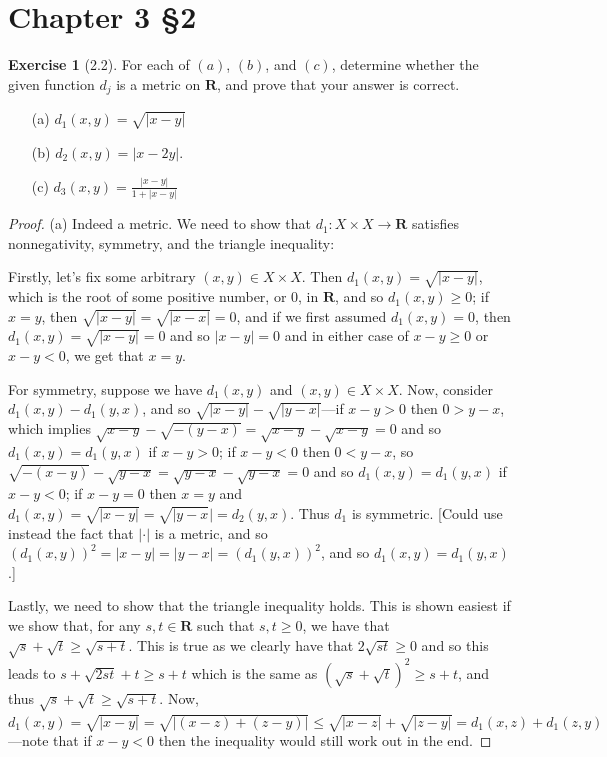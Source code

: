 \documentclass[9pt,reqno]{amsart}
\theoremstyle{definition}
\newtheorem{exercise}{Exercise}[section]
\newcommand{\rr}{\mathbf R}
\begin{document}
\section{Chapter 3 \S 2}
\begin{exercise}[2.2]
	 For each of $(a)$, $(b)$, and $(c)$, determine whether the given function $d_j$ is a metric on $\rr$, and prove that your answer is correct.
	 \begin{itemize}
	 	\item [(a)] $d_1 (x, y) = \sqrt{ |x-y|}$
	 	\item [(b)] $d_2 (x, y) = |x-2y|$.
	 	\item [(c)] $d_3 (x, y) = \frac{|x-y|}{1+|x-y|}$
	 \end{itemize}
\end{exercise}
\begin{proof}
	(a) Indeed a metric. We need to show that $d_1 \colon X \times X \to \rr$  satisfies nonnegativity, symmetry, and the triangle inequality:
	
	 Firstly, let's fix some arbitrary $(x,y) \in X \times X$. Then $d_1(x,y) = \sqrt{|x-y|}$, which is the root of some positive number, or $0$, in $\rr$, and so $d_1(x,y) \geq 0$; if $x =y$, then $\sqrt{|x-y|} = \sqrt{|x-x|} = 0$, and if we first assumed $d_1(x,y)= 0$, then $d_1(x,y) = \sqrt{|x-y|} = 0$ and so $|x-y| = 0$ and in either case of $x-y\geq 0$ or $x-y < 0$, we get that $x=y$. 
	 
	 For symmetry, suppose we have $d_1(x,y)$ and $(x,y) \in X \times X$. Now, consider $d_1(x,y) - d_1(y,x)$, and so $\sqrt{|x-y|} - \sqrt{|y-x|}$---if $x-y>0$ then $0 >y-x$, which implies $\sqrt{x-y} - \sqrt{-(y-x)}  = \sqrt{x-y} - \sqrt{x-y} = 0$ and so $d_1(x,y) = d_1(y,x)$ if $x-y>0$; if $x-y<0$ then $0<y-x$, so $\sqrt{-(x-y)} - \sqrt{y-x} = \sqrt{y-x} - \sqrt{y-x} = 0$ and so $d_1(x,y) = d_1 (y,x)$ if $x-y<0$; if $x-y = 0$ then $x=y$ and $d_1(x,y) = \sqrt{|x-y|} = \sqrt{|y-x}| = d_2(y,x)$. Thus $d_1$ is symmetric. [Could use instead the fact that $| \cdot |$ is a metric, and so $ (d_1(x,y))^2 = |x-y| = |y-x| = (d_1(y,x))^2$, and so $d_1(x,y) = d_1(y,x)$.]
	 
	 Lastly, we need to show that the triangle inequality holds. This is shown easiest if we show that, for any $s, t \in \rr$ such that $s,t \geq 0$, we have that $\sqrt{s}+\sqrt{t} \geq \sqrt{s+t}$. This is true as we clearly have that $2\sqrt{st} \geq 0$ and so this leads to $s+\sqrt{2st} + t  \geq s+t$ which is the same as $(\sqrt{s}+\sqrt{t})^2 \geq s+t$, and thus $\sqrt{s}+\sqrt{t} \geq \sqrt{s+t}$. Now, $d_1(x,y) = \sqrt{|x-y|} = \sqrt{|(x-z)+(z-y)|} \leq \sqrt{|x-z|} + \sqrt{|z-y|} = d_1(x,z) +d_1(z,y)$---note that if $x-y<0$ then the inequality would still work out in the end.    
	 

\end{proof}
\end{document}

